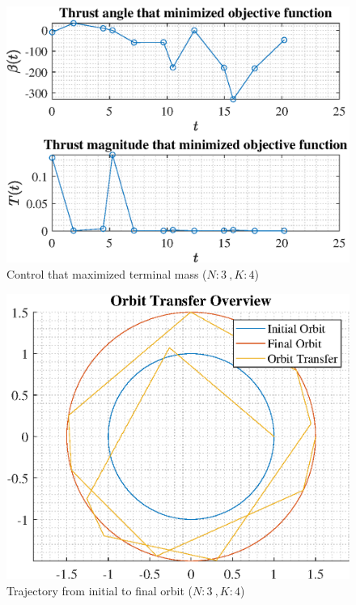 \documentclass[]{article}
\begin{document}
\begin{figure}
	\centering
	\includegraphics[scale=0.75]{control_N3_K4_C2_mf.eps}
	\caption{Control that maximized terminal mass (\(N:3\ , K:4\))}
	\label{fig:control_N3_K4_C2_mf}
\end{figure}
\begin{figure}
	\centering
	\includegraphics[scale=0.75]{orbit_N3_K4_C2_mf.eps}
	\caption{Trajectory from initial to final orbit (\(N:3\ , K:4\))}
	\label{fig:orbit_N3_K4_C2_mf}
\end{figure}
\end{document}
